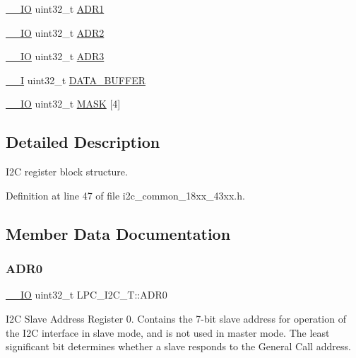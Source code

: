 \begin{DoxyCompactItemize}
\item 
\hyperlink{core__sc300_8h_aec43007d9998a0a0e01faede4133d6be}{\+\_\+\+\_\+\+IO} uint32\+\_\+t \hyperlink{struct_l_p_c___i2_c___t_ad948a871ac4d57bde1698f91ea554903}{A\+D\+R1}
\item 
\hyperlink{core__sc300_8h_aec43007d9998a0a0e01faede4133d6be}{\+\_\+\+\_\+\+IO} uint32\+\_\+t \hyperlink{struct_l_p_c___i2_c___t_aad3c43c326c675b3c9a02936f7b906fa}{A\+D\+R2}
\item 
\hyperlink{core__sc300_8h_aec43007d9998a0a0e01faede4133d6be}{\+\_\+\+\_\+\+IO} uint32\+\_\+t \hyperlink{struct_l_p_c___i2_c___t_a554732a259fca555bcec4201d756e945}{A\+D\+R3}
\item 
\hyperlink{core__sc300_8h_af63697ed9952cc71e1225efe205f6cd3}{\+\_\+\+\_\+I} uint32\+\_\+t \hyperlink{struct_l_p_c___i2_c___t_a63283a528320f69703f42fcc919ab4bc}{D\+A\+T\+A\+\_\+\+B\+U\+F\+F\+ER}
\item 
\hyperlink{core__sc300_8h_aec43007d9998a0a0e01faede4133d6be}{\+\_\+\+\_\+\+IO} uint32\+\_\+t \hyperlink{struct_l_p_c___i2_c___t_a9e734d7a24b7a02ac1887608552b9c69}{M\+A\+SK} \mbox{[}4\mbox{]}
\end{DoxyCompactItemize}


\subsection{Detailed Description}
I2C register block structure. 

Definition at line 47 of file i2c\+\_\+common\+\_\+18xx\+\_\+43xx.\+h.



\subsection{Member Data Documentation}
\mbox{\label{struct_l_p_c___i2_c___t_a900e0819e3f450e08a3566caf6f18851}} 
\subsubsection{\texorpdfstring{A\+D\+R0}{ADR0}}
{\footnotesize\ttfamily \hyperlink{core__sc300_8h_aec43007d9998a0a0e01faede4133d6be}{\+\_\+\+\_\+\+IO} uint32\+\_\+t L\+P\+C\+\_\+\+I2\+C\+\_\+\+T\+::\+A\+D\+R0}

I2C Slave Address Register 0. Contains the 7-\/bit slave address for operation of the I2C interface in slave mode, and is not used in master mode. The least significant bit determines whether a slave responds to the General Call address. 

